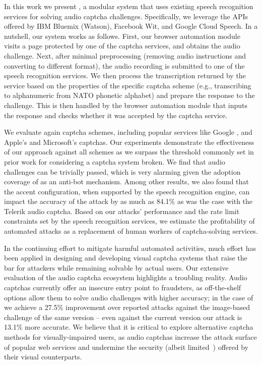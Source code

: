 In this work we present \system, a modular system that uses existing speech recognition services
for solving audio captcha challenges. Specifically, we leverage the
APIs offered by IBM Bluemix (Watson), Facebook Wit, and Google Cloud Speech. In a nutshell, our system works as
follows. First, our browser automation module visits a page protected by one of the captcha services,
and obtains the audio challenge. Next, after minimal preprocessing (removing audio instructions and 
converting to different format), the audio recording is submitted 
to one of the speech recognition services. We then process the transcription returned by the service
based on the properties of the specific captcha scheme (e.g., transcribing to alphanumeric 
from NATO phonetic alphabet) and prepare the response to the challenge. This is then handled by
the browser automation module that inputs the response and checks whether it was accepted by the captcha
service.

We evaluate \system again \no captcha schemes, including popular services like Google \re,
and Apple's and Microsoft's captchas. Our experiments demonstrate the effectiveness of our approach
against all schemes as we surpass the threshold commonly set in prior work for considering
a captcha system broken. We find that \re audio challenges can be trivially passed, which is 
very alarming given the adoption coverage of \re as an anti-bot mechanism. Among other results, 
we also found that the accent configuration, when supported by the speech recognition engine, 
can impact the accuracy of the attack by as much as 84.1\% as was the case with the Telerik audio 
captcha. Based on our attacks' performance and the rate limit constraints set by the speech 
recognition services, we estimate the profitability of automated attacks as a replacement of
human workers of captcha-solving services.


In the continuing effort to mitigate harmful automated activities, much effort has been applied in 
designing and developing visual captcha systems that raise the bar for attackers while remaining 
solvable by actual users. Our extensive evaluation of the audio captcha ecosystem highlights
a troubling reality. Audio captchas currently offer an insecure entry point to fraudsters,
as off-the-shelf options allow them to solve audio challenges with higher accuracy; in the case of \re
we achieve a 27.5\% improvement over reported attacks against the image-based challenge of the same version --
even against the current version our attack is 13.1\% more accurate.
We believe that it is critical to explore alternative captcha methods for visually-impaired users,
as audio captchas increase the attack surface of popular web services and undermine the security
(albeit limited~\cite{185128,sivakorn:eurosp16}) offered by their visual counterparts.

